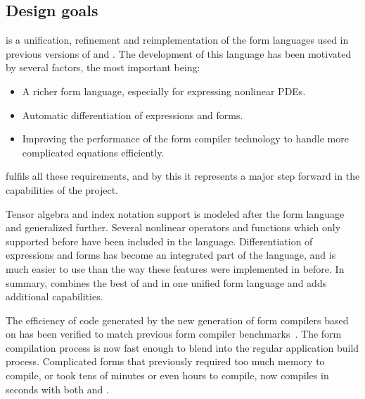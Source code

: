 \subsection{Design goals} \label{ufl:sec:goals}
\ufl{} is a unification, refinement and reimplementation of
the form languages used in previous versions of \ffc{} and \sfc{}.
The development of this language has been motivated by several
factors, the most important being:
\begin{itemize}
\item A richer form language, especially for expressing nonlinear PDEs.
\item Automatic differentiation of expressions and forms.
\item Improving the performance of the form compiler technology to handle more complicated equations efficiently.
\end{itemize}
\ufl{} fulfils all these requirements, and by this it represents
a major step forward in the capabilities of the \fenics{} project.

Tensor algebra and index notation support is modeled after the \ffc{}
form language and generalized further. Several nonlinear operators and
functions which only \sfc{} supported before have been included in the
language.  Differentiation of expressions and forms has become an
integrated part of the language, and is much easier to use than the
way these features were implemented in \sfc{} before.  In summary,
\ufl{} combines the best of \ffc{} and \sfc{} in one unified form
language and adds additional capabilities.

The efficiency of code generated by the new generation of form
compilers based on \ufl{} has been verified to match previous form
compiler benchmarks~\cite{AlnMar2009,OelWel2009}.  The form
compilation process is now fast enough to blend into the regular
application build process.  Complicated forms that previously required
too much memory to compile, or took tens of minutes or even hours to
compile, now compiles in seconds with both \sfc{} and \ffc{}.


